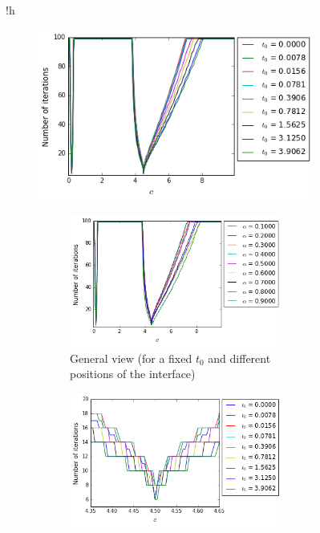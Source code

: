 \begin{figure}{!h}
\begin{subfigure}[t]{.5\linewidth}
\begin{center}
	\includegraphics[scale=.375]{Fig3a.png}
	\caption{General view (for a fixed interface and different values of $t_0$)}
\end{center}
\begin{subfigure}[t]{.5\linewidth}
\begin{center}
	\includegraphics[scale=.375]{Fig3b.png}
	\caption{General view (for a fixed $t_0$ and different positions of the interface)}
\end{center}
\end{subfigure}
\begin{subfigure}[t]{.5\linewidth}
\begin{center}
	\includegraphics[scale=.375]{Fig3c.png}

\end{center}
\end{subfigure}
\end{subfigure}
\end{figure}
